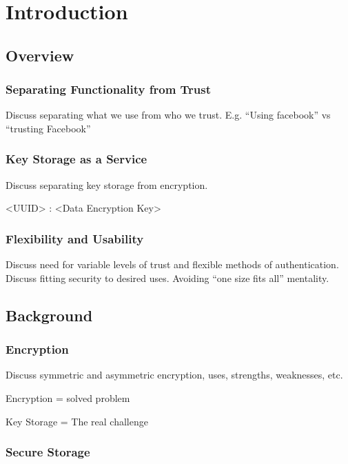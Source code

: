 \chapter{Introduction}
\label{chap:intro}

\section{Overview}

\subsection{Separating Functionality from Trust}

Discuss separating what we use from who we trust. E.g. ``Using
facebook'' vs ``trusting Facebook''

\subsection{Key Storage as a Service}

Discuss separating key storage from encryption.

<UUID> : <Data Encryption Key>

\subsection{Flexibility and Usability}

Discuss need for variable levels of trust and flexible methods of
authentication. Discuss fitting security to desired uses. Avoiding
``one size fits all'' mentality.

\section{Background}

\subsection{Encryption}

Discuss symmetric and asymmetric encryption, uses, strengths,
weaknesses, etc.

Encryption = solved problem

Key Storage = The real challenge

\subsection{Secure Storage}

